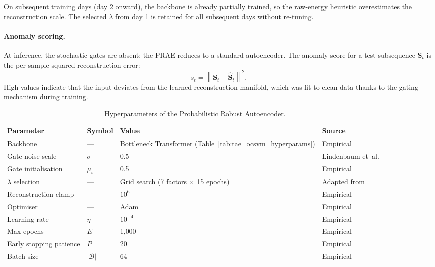 \documentclass[11pt]{report}
\begin{document}
On subsequent training days (day 2 onward), the backbone is already partially trained, so the raw-energy heuristic overestimates the reconstruction scale. The selected $\lambda$ from day 1 is retained for all subsequent days without re-tuning.

\paragraph{Anomaly scoring.}
At inference, the stochastic gates are absent: the PRAE reduces to a standard autoencoder. The anomaly score for a test subsequence $\mathbf{S}_t$ is the per-sample squared reconstruction error:
\begin{equation}
  \label{eq:prae_score}
  s_t = \left\|\mathbf{S}_t - \hat{\mathbf{S}}_t\right\|^2.
\end{equation}
High values indicate that the input deviates from the learned reconstruction manifold, which was fit to clean data thanks to the gating mechanism during training.

\begin{table}[H]
\centering
\caption{Hyperparameters of the Probabilistic Robust Autoencoder.}
\label{tab:prae_hyperparams}
\begin{tabular}{llll}
\toprule
\textbf{Parameter} & \textbf{Symbol} & \textbf{Value} & \textbf{Source} \\
\midrule
Backbone & --- & Bottleneck Transformer (Table~\ref{tab:tae_ocsvm_hyperparams}) & Empirical \\
Gate noise scale & $\sigma$ & 0.5 & Lindenbaum et~al.~\cite{lindenbaum2022prae} \\
Gate initialisation & $\mu_i$ & 0.5 & Empirical \\
$\lambda$ selection & --- & Grid search (7 factors $\times$ 15 epochs) & Adapted from~\cite{lindenbaum2022prae} \\
Reconstruction clamp & --- & $10^6$ & Empirical \\
Optimiser & --- & Adam & Empirical \\
Learning rate & $\eta$ & $10^{-4}$ & Empirical \\
Max epochs & $E$ & 1{,}000 & Empirical \\
Early stopping patience & $P$ & 20 & Empirical \\
Batch size & $|\mathcal{B}|$ & 64 & Empirical \\
\bottomrule
\end{tabular}
\end{table}
\end{document}
